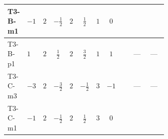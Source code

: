 \documentclass[8pt]{article}
\begin{document}
\begin{landscape}
\begin{longtable}{@{}llcccccc >{\raggedright\arraybackslash}p{0.21\linewidth} >{\raggedright\arraybackslash}p{0.21\linewidth} >{\raggedright\arraybackslash}p{0.21\linewidth}@{}}
T3-B-m1 & $-1$ & $2$ & $-\frac{1}{2}$ & $2$ & $\frac{1}{2}$ & $1$ & $0$ & \scriptsize\adjustbox{max width=\linewidth}{$\begin{gathered} +{\lambda_{12}^{(A)}} {\lambda_{HS_1}^{(A)}}\end{gathered}$} & \scriptsize\adjustbox{max width=\linewidth}{$\begin{gathered} +{\lambda_{H H^\dagger S_1^\dagger S_2^\dagger}^{\rm Cross}} (-2 \operatorname{Tr}\!\left({y_1}\,\left({y_2}\right)^{\dagger}\right)-4 (2 \left({\lambda_{H H^\dagger S_1^\dagger S_2^\dagger}^{\rm Cross}}\right)^{*}+\left({\lambda_{10}}\right)^{*}))\end{gathered}$} & \scriptsize\adjustbox{max width=\linewidth}{$\begin{gathered} -2 \left({\lambda_{H H^\dagger S_1^\dagger S_2^\dagger}^{\rm Cross}}\right)^{*} \operatorname{Tr}\!\left({y_2}\,\left({y_1}\right)^{\dagger}\right)\end{gathered}$} \\
\midrule
T3-B-p1 & $1$ & $2$ & $\frac{1}{2}$ & $2$ & $\frac{3}{2}$ & $1$ & $1$ & \scriptsize\adjustbox{max width=\linewidth}{$\begin{gathered} +{\lambda_{12}^{(A)}} {\lambda_{HS_1}^{(A)}}\end{gathered}$} & --- & --- \\
\midrule
T3-C-m3 & $-3$ & $2$ & $-\frac{3}{2}$ & $2$ & $-\frac{1}{2}$ & $3$ & $-1$ & \scriptsize\adjustbox{max width=\linewidth}{$\begin{gathered} +{\lambda_{12}^{(A)}} {\lambda_{HS_1}^{(A)}}\end{gathered}$} & --- & --- \\
\midrule
T3-C-m1 & $-1$ & $2$ & $-\frac{1}{2}$ & $2$ & $\frac{1}{2}$ & $3$ & $0$ & \scriptsize\adjustbox{max width=\linewidth}{$\begin{gathered} +{\lambda_{12}^{(A)}} {\lambda_{HS_1}^{(A)}}\end{gathered}$} & \scriptsize\adjustbox{max width=\linewidth}{$\begin{gathered} +{\lambda_{H H^\dagger S_1^\dagger S_2^\dagger}^{\rm Cross}} (-3 \operatorname{Tr}\!\left({y_1}\,\left({y_2}\right)^{\dagger}\right)-4 (2 \left({\lambda_{H H^\dagger S_1^\dagger S_2^\dagger}^{\rm Cross}}\right)^{*}+\left({\lambda_{10}}\right)^{*}))\end{gathered}$} & \scriptsize\adjustbox{max width=\linewidth}{$\begin{gathered} -3 \left({\lambda_{H H^\dagger S_1^\dagger S_2^\dagger}^{\rm Cross}}\right)^{*} \operatorname{Tr}\!\left({y_2}\,\left({y_1}\right)^{\dagger}\right)\end{gathered}$} \\

\end{longtable}
\end{landscape}
\end{document}
